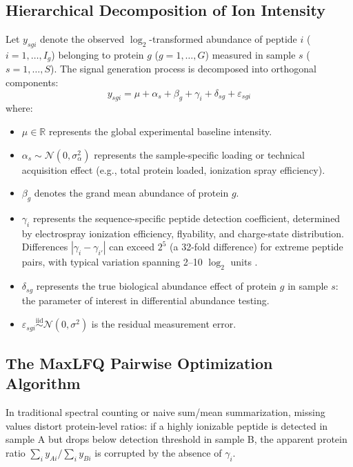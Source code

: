 \documentclass[11pt,oneside]{book}
\begin{document}
\subsection{Hierarchical Decomposition of Ion Intensity}
Let $y_{sgi}$ denote the observed $\log_2$-transformed abundance of peptide $i$ ($i = 1, \dots, I_g$) belonging to protein $g$ ($g = 1, \dots, G$) measured in sample $s$ ($s = 1, \dots, S$). The signal generation process is decomposed into orthogonal components:
\begin{equation}
y_{sgi} = \mu + \alpha_s + \beta_g + \gamma_i + \delta_{sg} + \varepsilon_{sgi}
\label{eq:intensity_decomposition}
\end{equation}
where:
\begin{itemize}
    \item $\mu \in \mathbb{R}$ represents the global experimental baseline intensity.
    \item $\alpha_s \sim \mathcal{N}(0, \sigma_\alpha^2)$ represents the sample-specific loading or technical acquisition effect (e.g., total protein loaded, ionization spray efficiency).
    \item $\beta_g$ denotes the grand mean abundance of protein $g$.
    \item $\gamma_i$ represents the sequence-specific peptide detection coefficient, determined by electrospray ionization efficiency, flyability, and charge-state distribution. Differences $|\gamma_i - \gamma_{i'}|$ can exceed $2^5$ (a 32-fold difference) for extreme peptide pairs, with typical variation spanning 2--10 $\log_2$ units \cite{silva2006absolute}.
    \item $\delta_{sg}$ represents the true biological abundance effect of protein $g$ in sample $s$: the parameter of interest in differential abundance testing.
    \item $\varepsilon_{sgi} \overset{\text{iid}}{\sim} \mathcal{N}(0, \sigma^2)$ is the residual measurement error.
\end{itemize}

\subsection{The MaxLFQ Pairwise Optimization Algorithm}
In traditional spectral counting or naive sum/mean summarization, missing values distort protein-level ratios: if a highly ionizable peptide is detected in sample A but drops below detection threshold in sample B, the apparent protein ratio $\sum_i y_{Ai} / \sum_i y_{Bi}$ is corrupted by the absence of $\gamma_i$. 
\end{document}
